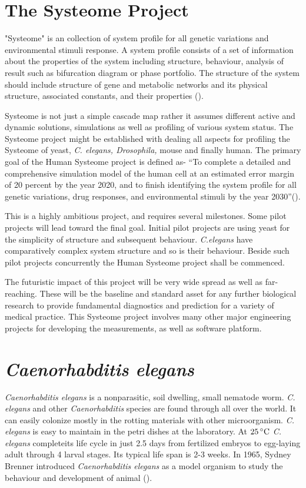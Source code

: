 \section{The Systeome Project}
"Systeome" is an collection of system profile for all genetic variations and environmental stimuli response. 
A system profile consists of a set of information about the properties of the system
including structure, behaviour, analysis of result such as bifurcation diagram or phase portfolio. The structure
of the system should include structure of gene and metabolic networks and its physical structure, associated constants,
and their properties (\cite{Kitano:2002}).

Systeome is not just a simple cascade map rather it assumes different active and dynamic solutions, simulations as
well as profiling of various system status. The Systeome project might be established with dealing all aspects for
profiling the Systeome of yeast, \textit{C. elegans, Drosophila,} mouse and finally human.
The primary goal of the Human Systeome project is defined as-
``To complete a detailed and comprehensive simulation model of the human cell at an estimated error margin of 
20 percent by the year 2020, and to finish identifying the system profile for all genetic variations, 
drug responses, and environmental stimuli by the year 2030''(\cite{Kitano:2002}).

This is a highly ambitious project, and requires several milestones. Some pilot projects will lead toward the final
goal. Initial pilot projects are using yeast for the simplicity of structure and subsequent behaviour.
\textit{C.elegans} have comparatively complex system structure and so is their behaviour. Beside such pilot projects
concurrently the Human Systeome project shall be commenced.

The futuristic impact of this project will be very wide spread as well as far-reaching. These will be the baseline
and standard asset for any further biological research to provide fundamental diagnostics and prediction for a variety
of medical practice. This Systeome project involves many other major engineering projects for developing the 
measurements, as well as software platform.

\section{\textit{Caenorhabditis elegans}}
\textit{Caenorhabditis elegans} is a nonparasitic, soil dwelling, small nematode worm. \textit{C. elegans} and 
other \textit{Caenorhabditis} species are found through all over the world. It can easily colonize 
mostly in the rotting materials with other microorganism. 
\textit{C. elegans} is easy to maintain in the petri dishes at the laboratory. At $25\,^{\circ}{\rm C}$
\textit{C. elegans} completeits life cycle in just 2.5 days from fertilized embryos to egg-laying 
adult through 4 larval stages. Its typical life span is 2-3 weeks. In 1965, Sydney Brenner 
introduced \textit{Caenorhabditis elegans} as a model organism to study the behaviour and development 
of animal (\cite{Brenner:1974}).

